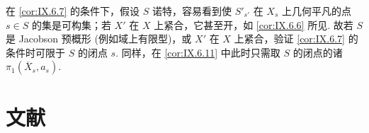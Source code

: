 \begin{remark}\label{rem:IX.6.12}
在 \ref{cor:IX.6.7} 的条件下，假设 $S$ 诺特，容易看到使 $S'_{s'}$ 在 $X_s$ 上几何平凡的点 $s \in S$ 的集是可构集；若 $X'$ 在 $X$ 上紧合，它甚至开，如 \ref{cor:IX.6.6} 所见. 故若 $S$ 是 Jacobson 预概形 (例如域上有限型)，或 $X'$ 在 $X$ 上紧合，验证 \ref{cor:IX.6.7} 的条件时可限于 $S$ 的闭点 $s$. 同样，在 \ref{cor:IX.6.11} 中此时只需取 $S$ 的闭点的诸 $\pi_1(\overline{X}_s, a_s)$.
\end{remark}

\section{文献}\printbibliography[heading=none]


